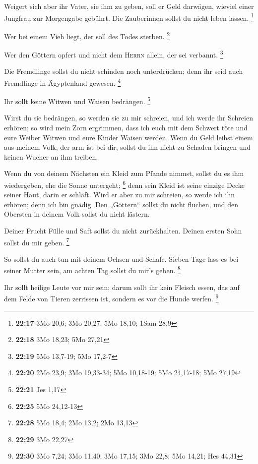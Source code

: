  Weigert sich aber ihr Vater, sie ihm zu geben, soll er
Geld darwägen, wieviel einer Jungfrau zur Morgengabe gebührt.
 Die Zauberinnen sollst du nicht leben lassen.
\footnote{\textbf{22:17} 3Mo 20,6; 3Mo 20,27; 5Mo 18,10; 1Sam 28,9}

 Wer bei einem Vieh liegt, der soll des Todes sterben.
\footnote{\textbf{22:18} 3Mo 18,23; 5Mo 27,21}

 Wer den Göttern opfert und nicht dem \textsc{Herrn}
allein, der sei verbannt. \footnote{\textbf{22:19} 5Mo 13,7-19; 5Mo
  17,2-7}

 Die Fremdlinge sollst du nicht schinden noch
unterdrücken; denn ihr seid auch Fremdlinge in Ägyptenland gewesen.
\footnote{\textbf{22:20} 2Mo 23,9; 3Mo 19,33-34; 5Mo 10,18-19; 5Mo
  24,17-18; 5Mo 27,19}

 Ihr sollt keine Witwen und Waisen bedrängen. \footnote{\textbf{22:21}
  Jes 1,17}

 Wirst du sie bedrängen, so werden sie zu mir schreien,
und ich werde ihr Schreien erhören;  so wird mein Zorn
ergrimmen, dass ich euch mit dem Schwert töte und eure Weiber Witwen und
eure Kinder Waisen werden.  Wenn du Geld leihst einem aus
meinem Volk, der arm ist bei dir, sollst du ihn nicht zu Schaden bringen
und keinen Wucher an ihm treiben.

 Wenn du von deinem Nächsten ein Kleid zum Pfande nimmst,
sollst du es ihm wiedergeben, ehe die Sonne untergeht; \footnote{\textbf{22:25}
  5Mo 24,12-13}  denn sein Kleid ist seine einzige Decke
seiner Haut, darin er schläft. Wird er aber zu mir schreien, so werde
ich ihn erhören; denn ich bin gnädig.  Den „Göttern``
sollst du nicht fluchen, und den Obersten in deinem Volk sollst du nicht
lästern.

 Deiner Frucht Fülle und Saft sollst du nicht
zurückhalten. Deinen ersten Sohn sollst du mir geben. \footnote{\textbf{22:28}
  5Mo 18,4; 2Mo 13,2; 2Mo 13,13}

 So sollst du auch tun mit deinem Ochsen und Schafe.
Sieben Tage lass es bei seiner Mutter sein, am achten Tag sollst du
mir's geben. \footnote{\textbf{22:29} 3Mo 22,27}

 Ihr sollt heilige Leute vor mir sein; darum sollt ihr
kein Fleisch essen, das auf dem Felde von Tieren zerrissen ist, sondern
es vor die Hunde werfen. \footnote{\textbf{22:30} 3Mo 7,24; 3Mo 11,40;
  3Mo 17,15; 3Mo 22,8; 5Mo 14,21; Hes 44,31}

